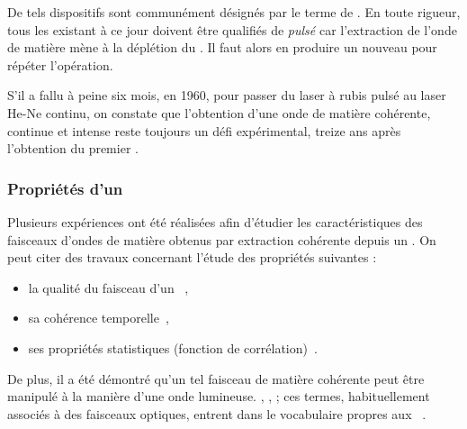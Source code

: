 De tels dispositifs sont communément désignés par le terme de \emph{\lat}.
%
% 
%
%
En toute rigueur, tous les \lats existant à ce jour doivent être qualifiés de \emph{pulsé} car l'extraction de l'onde de matière mène à la déplétion du \becc. Il faut alors en produire un nouveau pour répéter l'opération.

S'il a fallu à peine six mois, en 1960, pour passer du laser à rubis pulsé au laser He-Ne continu, on constate que l'obtention d'une onde de matière cohérente, continue et intense reste toujours un défi expérimental, treize ans après l'obtention du premier \becc.

\subsubsection{Propriétés d'un \lat}
Plusieurs expériences ont été réalisées afin d'étudier les caractéristiques des faisceaux d'ondes de matière obtenus par extraction cohérente depuis un \bec. On peut citer des travaux concernant l'étude des propriétés suivantes :
\begin{itemize}
	\item la qualité du faisceau d'un \lat~\cite{LTR01,RGC06},
	\item sa cohérence temporelle~\cite{KHE01},
	\item ses propriétés statistiques (fonction de corrélation)~\cite{ORK05}.
\end{itemize}
De plus, il a été démontré qu'un tel faisceau de matière cohérente peut être manipulé à la manière d'une onde lumineuse. , , ; ces termes, habituellement associés à des faisceaux optiques, entrent dans le vocabulaire propres aux \lats~\cite{BKG01}.



